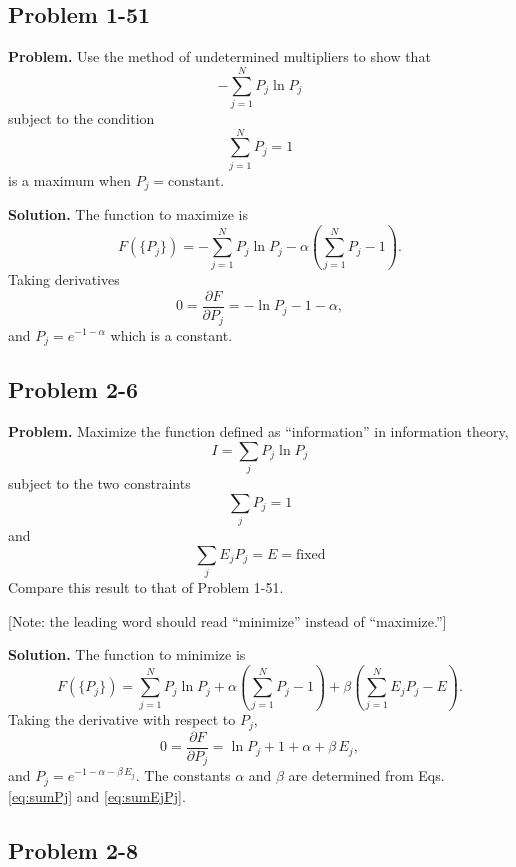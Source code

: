 \documentclass[twocolumn, 10pt]{article}
\numberwithin{equation}{section}
\newenvironment{problem}
{\par\medskip\sffamily \color{problue}
  \textbf{Problem. }\ignorespaces}
{\medskip}
\newenvironment{solution}
{\par\medskip
  \textbf{Solution. }\ignorespaces}
{\medskip}
\begin{document}
\subsection{Problem 1-51}

\begin{problem}
  Use the method of undetermined multipliers to show that
  $$
  -\sum_{j=1}^N P_j \ln P_j
  $$
  subject to the condition
  $$
  \sum_{j=1}^N P_j = 1
  $$
  is a maximum when $P_j = \mathrm{constant}$.
\end{problem}

\begin{solution}
The function to maximize is
$$
F(\{P_j\}) = -\sum_{j=1}^N P_j \ln P_j - \alpha \left( \sum_{j=1}^N P_j - 1 \right).
$$
Taking derivatives
$$
  0 = \frac{ \partial F } { \partial P_j }
  =
  -\ln P_j - 1 - \alpha,
$$
and $P_j = e^{-1-\alpha}$ which is a constant.
\end{solution}

\subsection{Problem 2-6}

\begin{problem}
Maximize the function defined as ``information'' in information theory,
$$
I = \sum_j P_j \ln P_j
$$
subject to the two constraints
\begin{equation}
  \sum_j P_j = 1
  \label{eq:sumPj}
\end{equation}
and
\begin{equation}
  \sum_j E_j P_j = E = \mathrm{fixed}
  \label{eq:sumEjPj}
\end{equation}
Compare this result to that of Problem 1-51.

[Note: the leading word should read ``minimize''
  instead of ``maximize.'']
\end{problem}

\begin{solution}
The function to minimize is
$$
F(\{P_j\}) = \sum_{j=1}^N P_j \ln P_j
  + \alpha \left( \sum_{j=1}^N P_j - 1 \right)
  + \beta \left( \sum_{j=1}^N E_j P_j - E \right).
$$
Taking the derivative with respect to $P_j$,
$$
  0 = \frac{ \partial F } { \partial P_j }
  =
  \ln P_j + 1 + \alpha + \beta \, E_j,
$$
and $P_j = e^{-1-\alpha-\beta \, E_j}$.
%
The constants $\alpha$ and $\beta$
are determined from Eqs. \eqref{eq:sumPj} and \eqref{eq:sumEjPj}.
\end{solution}


\subsection{Problem 2-8}
\end{document}
